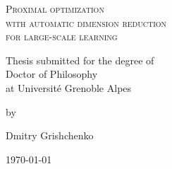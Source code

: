 \begin{titlepage}
\doublespacing

\vspace*{\fill}

	\centering

	{\scshape\Huge Proximal optimization\\ with automatic
dimension reduction\\ for large-scale learning\par}

	\vspace{3cm}
	
	{\LARGE Thesis submitted for the degree of \\ Doctor of Philosophy\\ at Universit\'e Grenoble Alpes \par}

	
	\vfill 
	
	{\LARGE by\par}

	\vfill
	
	{\LARGE Dmitry Grishchenko\par}

	\vfill

\vspace*{\fill}

	{\LARGE 	\today\par}
	
\end{titlepage}